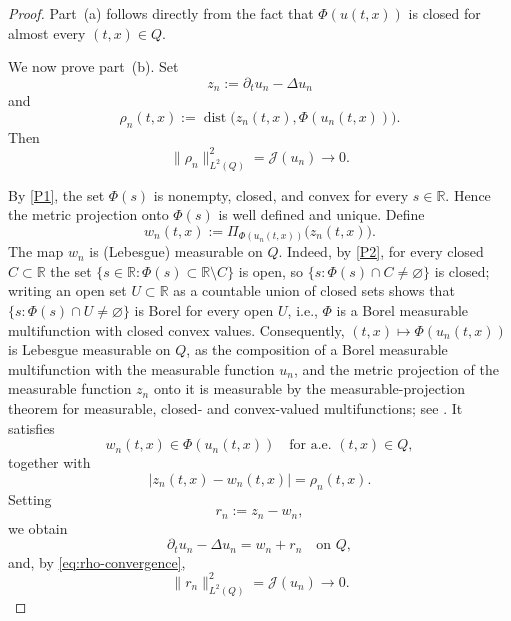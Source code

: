 \documentclass[11pt]{elsarticle}
\theoremstyle{definition}
\theoremstyle{remark}
\numberwithin{equation}{section}
\begin{document}
	\begin{proof}
		Part~\textup{(a)} follows directly from the fact that
		$\Phi(u(t,x))$ is closed for almost every $(t,x)\in Q$. 
		
		We now prove part~\textup{(b)}. Set
		\[
		z_n:=\partial_tu_n-\Delta u_n
		\]
		and
		\[
		\rho_n(t,x)
		:=
		\operatorname{dist}
		\bigl(z_n(t,x),\Phi(u_n(t,x))\bigr).
		\]
		Then
		\begin{equation}
		\|\rho_n\|_{L^2(Q)}^2
		=
		\mathcal{J}(u_n)
		\longrightarrow 0.
		\label{eq:rho-convergence}
		\end{equation}
		
		By \ref{P1}, the set $\Phi(s)$ is nonempty, closed, and convex
		for every $s\in\mathbb{R}$. Hence the metric projection onto
		$\Phi(s)$ is well defined and unique. Define
		\[
		w_n(t,x)
		:=
		\Pi_{\Phi(u_n(t,x))}
		\bigl(z_n(t,x)\bigr).
		\]
		The map $w_n$ is (Lebesgue) measurable on $Q$. Indeed, by
		\ref{P2}, for every closed $C\subset\mathbb{R}$ the set
		$\{s\in\mathbb{R}:\Phi(s)\subset\mathbb{R}\setminus C\}$ is open,
		so $\{s:\Phi(s)\cap C\neq\varnothing\}$ is closed; writing an open
		set $U\subset\mathbb{R}$ as a countable union of closed sets shows
		that $\{s:\Phi(s)\cap U\neq\varnothing\}$ is Borel for every open
		$U$, i.e., $\Phi$ is a Borel measurable multifunction with closed
		convex values. Consequently, $(t,x)\mapsto\Phi(u_n(t,x))$ is
		Lebesgue measurable on $Q$, as the composition of a Borel measurable
		multifunction with the measurable function $u_n$, and the metric
		projection of the measurable function $z_n$ onto it is measurable by
		the measurable-projection theorem for measurable, closed- and
		convex-valued multifunctions; see
		\cite[Theorem~8.2.11]{aubin_frankowska_2009}. It satisfies
		\[
		w_n(t,x)\in\Phi(u_n(t,x))
		\quad\text{for a.e. }(t,x)\in Q,
		\]
		together with
		\[
		|z_n(t,x)-w_n(t,x)|
		=
		\rho_n(t,x).
		\]
		Setting
		\[
		r_n:=z_n-w_n,
		\]
		we obtain
		\begin{equation}
		\partial_tu_n-\Delta u_n=w_n+r_n
		\quad\text{on }Q,
		\label{eq:pde-decomposition}
		\end{equation}
		and, by \eqref{eq:rho-convergence},
		\begin{equation}
		\|r_n\|_{L^2(Q)}^2
		=
		\mathcal{J}(u_n)
		\longrightarrow 0.
		\label{eq:rn-convergence}
		\end{equation}
		

\end{proof}
\end{document}
